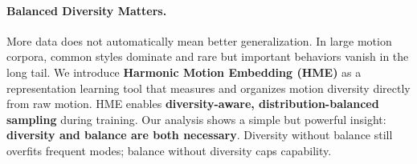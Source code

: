 \begin{table}[t]
  \centering
  \caption{\textbf{Comparison of \methodname with related works.}}
  \label{tab:comp}
  \vspace{-10pt}
\end{table}

\paragraph{Balanced Diversity Matters.}
More data does not automatically mean better generalization. In large motion corpora, common styles dominate and rare but important behaviors vanish in the long tail. We introduce \textbf{Harmonic Motion Embedding (HME)} as a representation learning tool that measures and organizes motion diversity directly from raw motion. HME enables \textbf{diversity-aware, distribution-balanced sampling} during training. Our analysis shows a simple but powerful insight: \textbf{diversity and balance are both necessary}. Diversity without balance still overfits frequent modes; balance without diversity caps capability.

